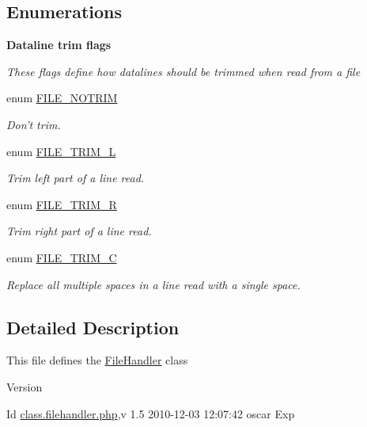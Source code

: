 \subsection*{Enumerations}
\begin{Indent}{\bf Dataline trim flags}\par
{\em \label{_amgrp09e264f44360b2d7954f16ee5d28e654}
 These flags define how datalines should be trimmed when read from a file }\begin{DoxyCompactItemize}
\item 
enum \hyperlink{class_8filehandler_8php_a3720f2e15eb9e16e29d8ecbb96763662}{FILE\_\-NOTRIM} 
\begin{DoxyCompactList}\small\item\em Don't trim. \item\end{DoxyCompactList}\item 
enum \hyperlink{class_8filehandler_8php_a080de95fd7cf2e8d8ac78ac7ad9471ee}{FILE\_\-TRIM\_\-L} 
\begin{DoxyCompactList}\small\item\em Trim left part of a line read. \item\end{DoxyCompactList}\item 
enum \hyperlink{class_8filehandler_8php_a7ee25ec88036b90f5a0ae8be7bc41769}{FILE\_\-TRIM\_\-R} 
\begin{DoxyCompactList}\small\item\em Trim right part of a line read. \item\end{DoxyCompactList}\item 
enum \hyperlink{class_8filehandler_8php_a2787c3a1ecef8697c863800d0b2848a4}{FILE\_\-TRIM\_\-C} 
\begin{DoxyCompactList}\small\item\em Replace all multiple spaces in a line read with a single space. \item\end{DoxyCompactList}\end{DoxyCompactItemize}
\end{Indent}


\subsection{Detailed Description}
This file defines the \hyperlink{classFileHandler}{FileHandler} class \begin{DoxyVersion}{Version}

\end{DoxyVersion}
\begin{DoxyParagraph}{Id}
\hyperlink{class_8filehandler_8php}{class.filehandler.php},v 1.5 2010-\/12-\/03 12:07:42 oscar Exp 
\end{DoxyParagraph}


